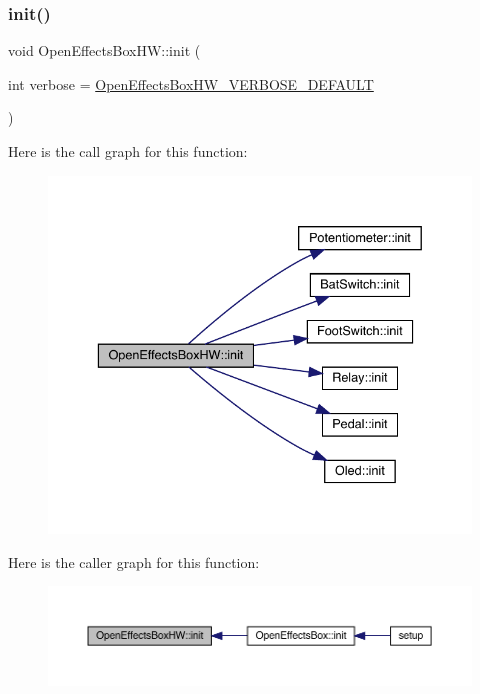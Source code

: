 \subsubsection{\texorpdfstring{init()}{init()}}
{\footnotesize\ttfamily void Open\+Effects\+Box\+H\+W\+::init (\begin{DoxyParamCaption}\item[{int}]{verbose = {\ttfamily \mbox{\hyperlink{_open_effects_box_h_w_8h_ab5b85b536bb3e261f523db8c00ea9605}{Open\+Effects\+Box\+H\+W\+\_\+\+V\+E\+R\+B\+O\+S\+E\+\_\+\+D\+E\+F\+A\+U\+LT}}} }\end{DoxyParamCaption})}

Here is the call graph for this function\+:\nopagebreak
\begin{figure}[H]
\begin{center}
\leavevmode
\includegraphics[width=336pt]{class_open_effects_box_h_w_ac070397f7c596522c83c7ff1d540e2df_cgraph}
\end{center}
\end{figure}
Here is the caller graph for this function\+:\nopagebreak
\begin{figure}[H]
\begin{center}
\leavevmode
\includegraphics[width=350pt]{class_open_effects_box_h_w_ac070397f7c596522c83c7ff1d540e2df_icgraph}
\end{center}
\end{figure}
\mbox{\label{class_open_effects_box_h_w_a8bb57e4e28ba7012045ce7adaa15b78b}} 
